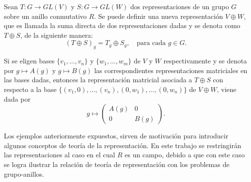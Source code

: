 \begin{ejemplo}
Sean $T \colon G \to GL(V)$ y $S \colon G \to GL(W)$ dos representaciones de un grupo $G$ sobre un anillo conmutativo $R$. Se puede definir una nueva representación $V \oplus W$, que es llamada la suma directa de dos representaciones dadas y se denota como $T \oplus S$, de la siguiente manera: \begin{equation*} (T \oplus S)_g = T_g \oplus S_g, \quad \mbox{para cada } g \in G. \end{equation*}

Si se eligen bases $\{v_1, \dots, v_n\}$ y $\{ w_1, \dots, w_m \}$ de $V$ y $W$ respectivamente y se denota por $g \mapsto A(g)$ y $g \mapsto B(g)$ las correspondientes representaciones matriciales en las bases dadas, entonces la representación matricial asociada a $T \oplus S$ con respecto a la base $\{ (v_1,0), \dots , (v_n), (0,w_1), \dots, (0,w_n)  \}$ de $V \oplus W$, viene dada por
\begin{equation*} g \mapsto \begin{pmatrix}
A(g) & 0 \\
0 & B(g)
\end{pmatrix}. \end{equation*}
\end{ejemplo}
Los ejemplos anteriormente expuestos, sirven de motivación para introducir algunos conceptos de teoría de la representación. En este trabajo se restringirán las representaciones al caso en el cual $R$ es un campo, debido a que con este caso se logra ilustrar la relación de teoría de representación con los problemas de grupo-anillos.

